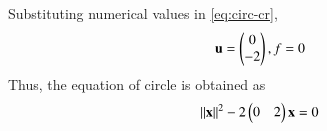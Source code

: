 Substituting numerical values in 
	\eqref{eq:circ-cr},
\begin{align}
	\mathbf{u} = \begin{pmatrix}0\\-2\end{pmatrix},
	f 
	  = 0
\end{align}
Thus, the equation of circle is obtained as
\begin{align}
	\left\lVert\mathbf{x}\right\rVert^2 - 2\begin{pmatrix}0 & 2\end{pmatrix}\mathbf{x} = 0
\end{align}

